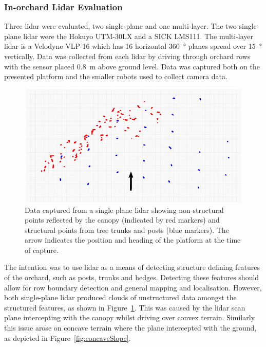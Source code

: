 \documentclass[preprint,authoryear,12pt]{elsarticle}
\begin{document}
    \subsubsection{In-orchard Lidar Evaluation}
        Three lidar were evaluated, two single-plane and one multi-layer.
        The two single-plane lidar were the Hokuyo UTM-30LX and a SICK LMS111.
        The multi-layer lidar is a Velodyne VLP-16 which has 16 horizontal \SI{360}{\degree} planes spread over \SI{15}{\degree} vertically.
        Data was collected from each lidar by driving through orchard rows with the sensor placed \SI{0.8}{\meter} above ground level.
        Data was captured both on the presented platform and the smaller robots used to collect camera data.

        \begin{figure}[htb]
            \centering
            \includegraphics[width=\linewidth]{imgs/canopy_data/canopy_data.pdf}
            \caption{
                Data captured from a single plane lidar showing non-structural points reflected by the canopy (indicated by red markers) and structural points from tree trunks and posts (blue markers).
                The arrow indicates the position and heading of the platform at the time of capture.
            }
            \label{fig:canopyDataCloud}
        \end{figure}

        The intention was to use lidar as a means of detecting structure defining features of the orchard, such as posts, trunks and hedges.
        Detecting these features should allow for row boundary detection and general mapping and localisation.
        However, both single-plane lidar produced clouds of unstructured data amongst the structured features, as shown in Figure~\ref{fig:canopyDataCloud}.
        This was caused by the lidar scan plane intercepting with the canopy whilst driving over convex terrain.
        Similarly this issue arose on concave terrain where the plane intercepted with the ground, as depicted in Figure~\ref{fig:concaveSlope}.
\end{document}
